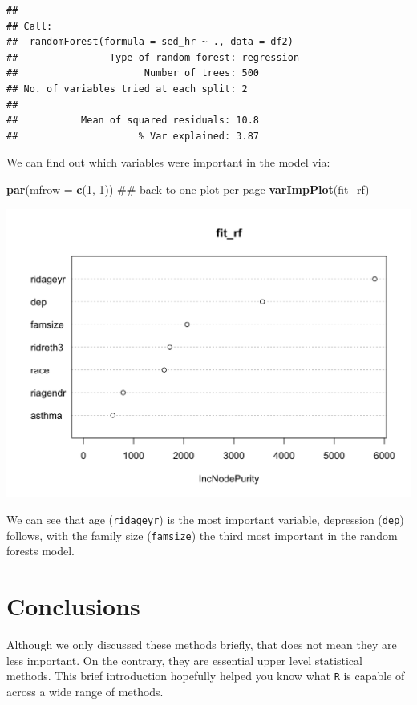 \documentclass[]{tufte-book}
\newenvironment{Shaded}{}{}
\newcommand{\KeywordTok}[1]{\textcolor[rgb]{0.00,0.44,0.13}{\textbf{#1}}}
\newcommand{\DataTypeTok}[1]{\textcolor[rgb]{0.56,0.13,0.00}{#1}}
\newcommand{\DecValTok}[1]{\textcolor[rgb]{0.25,0.63,0.44}{#1}}
\newcommand{\NormalTok}[1]{#1}
\theoremstyle{definition}
\theoremstyle{definition}
\theoremstyle{remark}
\begin{document}
\begin{verbatim}
## 
## Call:
##  randomForest(formula = sed_hr ~ ., data = df2) 
##                Type of random forest: regression
##                      Number of trees: 500
## No. of variables tried at each split: 2
## 
##           Mean of squared residuals: 10.8
##                     % Var explained: 3.87
\end{verbatim}

We can find out which variables were important in the model via:

\begin{Shaded}
\begin{Highlighting}[]
\KeywordTok{par}\NormalTok{(}\DataTypeTok{mfrow =} \KeywordTok{c}\NormalTok{(}\DecValTok{1}\NormalTok{, }\DecValTok{1}\NormalTok{))  ## back to one plot per page}
\KeywordTok{varImpPlot}\NormalTok{(fit_rf)}
\end{Highlighting}
\end{Shaded}

\includegraphics{_main_files/figure-latex/unnamed-chunk-110-1}

We can see that age (\texttt{ridageyr}) is the most important variable,
depression (\texttt{dep}) follows, with the family size
(\texttt{famsize}) the third most important in the random forests model.

\section*{Conclusions}\label{conclusions-3}

Although we only discussed these methods briefly, that does not mean
they are less important. On the contrary, they are essential upper level
statistical methods. This brief introduction hopefully helped you know
what \texttt{R} is capable of across a wide range of methods.
\end{document}
